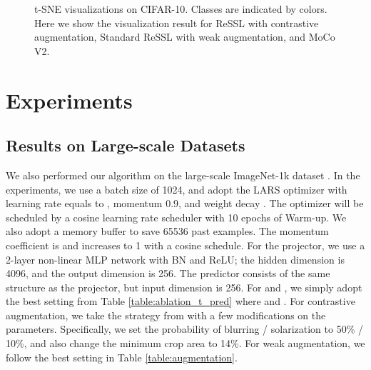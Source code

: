\documentclass{article}
\newcommand{\<}{\left\langle}
\renewcommand{\>}{\right\rangle}
\begin{document}
\begin{figure*}[h]
    \vspace{-10pt}
    \centering
    \caption{t-SNE visualizations on CIFAR-10. Classes are indicated by colors. Here we show the visualization result for ReSSL with contrastive augmentation, Standard ReSSL with weak augmentation, and MoCo V2. }
    \vspace{-10pt}
    \label{fig:tsne}
\end{figure*}

 \section{Experiments}

\subsection{Results on Large-scale Datasets}
We also performed our algorithm on the large-scale ImageNet-1k dataset \cite{imagenet_cvpr09}. In the experiments, we use a batch size of 1024, and adopt the LARS \cite{lars} optimizer with learning rate equals to , momentum 0.9, and weight decay . The optimizer will be scheduled by a cosine learning rate scheduler \cite{cosine_lr} with 10 epochs of Warm-up. We also adopt a memory buffer to save 65536 past examples. The momentum coefficient is  and increases to 1 with a cosine schedule. For the projector, we use a 2-layer non-linear MLP network with BN and ReLU; the hidden dimension is 4096, and the output dimension is 256. The predictor consists of the same structure as the projector, but input dimension is 256.  For  and , we simply adopt the best setting from Table \ref{table:ablation_t_pred} where  and . For contrastive augmentation, we take the strategy from \cite{byol} with a few modifications on the parameters. Specifically, we set the probability of blurring / solarization to 50\% / 10\%, and also change the minimum crop area to 14\%. For weak augmentation, we follow the best setting in Table \ref{table:augmentation}. 
\end{document}
